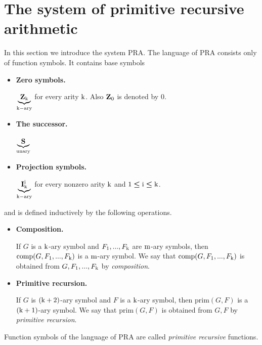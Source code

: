 \documentclass[10pt]{amsart}
\newcommand{\mleq}{\boldsymbol{\leq}}
\begin{document}
\section{The system of primitive recursive arithmetic}
\noindent
In this section we introduce the system $\mathrm{PRA}$. The language of $\mathrm{PRA}$ consists only of function symbols. It contains base symbols
\begin{itemize}
	\item[] \textbf{Zero symbols.}

    $\underbrace{\mathbf{Z}_{\rm{k}}}_{\rm{k-ary}}$ for every arity $\rm{k}$. Also $\mathbf{Z}_{\rm{0}}$ is denoted by $0$.
	\item[] \textbf{The successor.}

		$\underbrace{\mathbf{S}}_{\mathrm{unary}}$
	\item[] \textbf{Projection symbols.}

    $\underbrace{\mathbf{I}^{\rm{i}}_{\rm{k}}}_{\rm{k-ary}}$ for every nonzero arity $\rm{k}$ and $\rm{1} \mleq \rm{i} \mleq k$.
\end{itemize}
and is defined inductively by the following operations.
\begin{itemize}
	\item[] \textbf{Composition.}

    If $G$ is a $\rm{k}$-ary symbol and $F_{\rm{1}},...,F_{\rm{k}}$ are $\rm{m}$-ary symbols, then $\mathrm{comp}(G,F_{\rm{1}},...,F_{\rm{k}})$ is a $\rm{m}$-ary symbol. We say that $\mathrm{comp}(G,F_{\rm{1}},...,F_{\rm{k}})$ is obtained from $G,F_{\rm{1}},...,F_{\rm{k}}$ by \textit{composition}.
	\item[] \textbf{Primitive recursion.}

    If $G$ is $\rm{(k+2)}$-ary symbol and $F$ is a $\rm{k}$-ary symbol, then $\mathrm{prim}(G,F)$ is a $\rm{(k+1)}$-ary symbol. We say that $\mathrm{prim}(G,F)$ is obtained from $G,F$ by \textit{primitive recursion}.
\end{itemize}

\begin{definition}
	Function symbols of the language of $\mathrm{PRA}$ are called \textit{primitive recursive} functions.
\end{definition}
\end{document}
